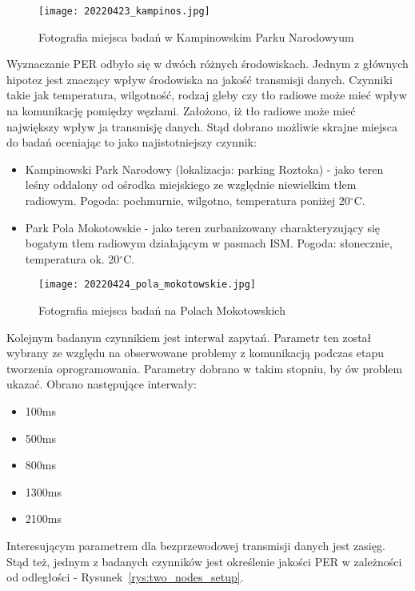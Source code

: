 \begin{figure}[!ht]
	\centering \texttt{[image: 20220423\_kampinos.jpg]} 
	\caption{Fotografia miejsca badań w Kampinowskim Parku Narodowyum}
	\label{rys:kampinowski}
\end{figure}

Wyznaczanie PER odbyło się w dwóch różnych środowiskach. Jednym z głównych hipotez jest znaczący wpływ
środowiska na jakość transmisji danych. Czynniki takie jak temperatura, wilgotność, rodzaj gleby czy
tło radiowe może mieć wpływ na komunikację pomiędzy węzłami. Założono, iż tło radiowe może mieć
największy wpływ ja transmisję danych. Stąd dobrano możliwie skrajne miejsca do badań oceniając
to jako najistotniejszy czynnik:
\begin{itemize}
\item Kampinowski Park Narodowy (lokalizacja: parking Roztoka) - jako teren leśny oddalony od ośrodka miejskiego
ze względnie niewielkim tłem radiowym. Pogoda: pochmurnie, wilgotno, temperatura poniżej 20$^{\circ}$C.
\item Park Pola Mokotowskie - jako teren zurbanizowany charakteryzujący się bogatym tłem radiowym działającym
w pasmach \gls{ISM}. Pogoda: słonecznie, temperatura ok. 20$^{\circ}$C.
\end{itemize}

\begin{figure}[!ht]
	\centering \texttt{[image: 20220424\_pola\_mokotowskie.jpg]} 
	\caption{Fotografia miejsca badań na Polach Mokotowskich}
	\label{rys:mokotowskie}
\end{figure}

Kolejnym badanym czynnikiem jest interwał zapytań. Parametr ten został wybrany ze względu na obserwowane
problemy z komunikacją podczas etapu tworzenia oprogramowania. Parametry dobrano w takim stopniu, by ów problem
ukazać. Obrano następujące interwały:
\begin{itemize} \label {items:ping_intervals}
\item 100ms
\item 500ms
\item 800ms
\item 1300ms
\item 2100ms
\end{itemize}

Interesującym parametrem dla bezprzewodowej transmisji danych jest zasięg. Stąd też, jednym z badanych czynników jest
określenie jakości PER w zależności od odległości - Rysunek~\ref{rys:two_nodes_setup}.

